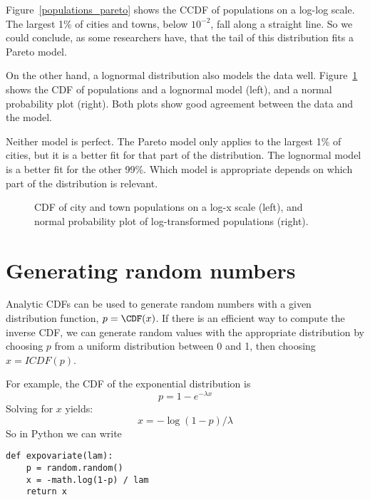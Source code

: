 Figure~\ref{populations_pareto} shows the CCDF of populations on a
log-log scale.  The largest 1\% of cities and towns, below $10^{-2}$,
fall along a straight line.  So we could
conclude, as some researchers have, that the tail of this distribution
fits a Pareto model.

On the other hand, a lognormal distribution also models the data well.
Figure~\ref{populations_normal} shows the CDF of populations and a
lognormal model (left), and a normal probability plot (right).  Both
plots show good agreement between the data and the model.

Neither model is perfect.
The Pareto model only applies to the largest 1\% of cities, but it
is a better fit for that part of the distribution.  The lognormal
model is a better fit for the other 99\%.
Which model is appropriate depends on which part of the distribution
is relevant.

\begin{figure}
\caption{CDF of city and town populations on a log-x scale (left), and
normal probability plot of log-transformed populations (right).}
\label{populations_normal}
\end{figure}


\section{Generating random numbers}

Analytic CDFs can be used to generate random numbers with a given
distribution function, $p = \CDF(x)$.  If there is an efficient way to
compute the inverse CDF, we can generate random values
with the appropriate distribution by choosing $p$ from a uniform
distribution between 0 and 1, then choosing
$x = ICDF(p)$.

For example, the CDF of the exponential distribution is
%
\[ p = 1 - e^{-\lambda x} \]
%
Solving for $x$ yields:
%
\[ x = -\log (1 - p) / \lambda \]
%
So in Python we can write
%
\begin{verbatim}
def expovariate(lam):
    p = random.random()
    x = -math.log(1-p) / lam
    return x
\end{verbatim}

